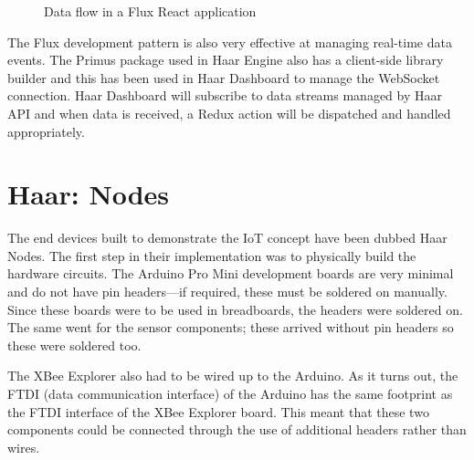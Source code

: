     \begin{figure}
      \centering
    \caption{Data flow in a Flux React application}\label{figure:flux-flow}
  \end{figure}

  The Flux development pattern is also very effective at managing real-time data events. The Primus package used in Haar Engine also has a client-side library builder and this has been used in Haar Dashboard to manage the WebSocket connection. Haar Dashboard will subscribe to data streams managed by Haar API and when data is received, a Redux action will be dispatched and handled appropriately.

  \section{Haar: Nodes}
    The end devices built to demonstrate the IoT concept have been dubbed Haar Nodes. The first step in their implementation was to physically build the hardware circuits. The Arduino Pro Mini development boards are very minimal and do not have pin headers---if required, these must be soldered on manually. Since these boards were to be used in breadboards, the headers were soldered on. The same went for the sensor components; these arrived without pin headers so these were soldered too.

    The XBee Explorer also had to be wired up to the Arduino. As it turns out, the FTDI (data communication interface) of the Arduino has the same footprint as the FTDI interface of the XBee Explorer board. This meant that these two components could be connected through the use of additional headers rather than wires. 

